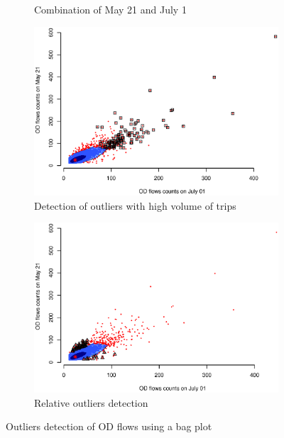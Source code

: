 \documentclass[a4paper,UKenglish]{lipics-v2016}
\begin{document}
\begin{figure}
\begin{subfigure}[b]{0.49\textwidth}
	\caption{Combination of May 21 and July 1}
	\label{fig:OD_0721_0521}
	\end{subfigure}
    \hfill
	\begin{subfigure}[b]{0.49\textwidth}
	\includegraphics[width=\textwidth]{images/Outliers_high_0701_0521.eps}
	\caption{Detection of outliers with high volume of trips}
	\label{fig:OD_outliers_high}
    \end{subfigure}
	\begin{subfigure}[b]{0.53\textwidth}
	\includegraphics[width=\textwidth]{images/Outliers_rare_0701_0521.eps}
	\caption{Relative outliers detection}
	\label{fig:OD_outliers_rare}
    \end{subfigure}
	\caption{Outliers detection of OD flows using a bag plot}\label{fig:bagplot_0521_0701}	
\end{figure}
\end{document}
